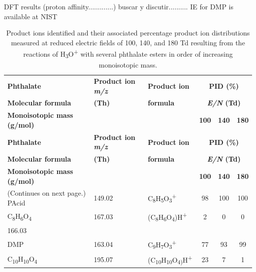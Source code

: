 DFT results (proton affinity.............) buscar y discutir..........
IE for DMP is available at NIST







{\small

\begin{longtable}[c]{lllccc}
\caption{Product ions identified and their associated percentage product ion distributions measured at reduced electric fields of 100, 140, and 180 Td resulting
from the reactions of H\textsubscript{3}O\textsuperscript{+} with several phthalate esters in order of increasing monoisotopic mass.} 
\label{table:PID}\\
\hline 
\textbf{Phthalate}& \textbf{Product ion \textit{m/z}} & \textbf{Product ion}  & \multicolumn{3}{c}{\textbf{PID (\%)}} \\ \cline{4-6} 
\textbf{Molecular formula} &\textbf{(Th)}&   \textbf{formula }& \multicolumn{3}{c}{\textbf{\textit{E/N} (Td)}} \\ \cline{4-6} 
\textbf{Monoisotopic mass (g/mol)  }      &                      &                     & \textbf{100 }     & \textbf{140}     & \textbf{180}  \\
\hline
\endfirsthead
\hline 
\textbf{Phthalate}& \textbf{Product ion \textit{m/z}} & \textbf{Product ion}  & \multicolumn{3}{c}{\textbf{PID (\%)}} \\ \cline{4-6} 
\textbf{Molecular formula} &\textbf{(Th)}&   \textbf{formula }& \multicolumn{3}{c}{\textbf{\textit{E/N} (Td)}} \\ \cline{4-6} 
\textbf{Monoisotopic mass (g/mol)  }      &                      &                     & \textbf{100 }     & \textbf{140}     & \textbf{180}  \\
\hline
\endhead
%
  (Continues on next page.)
\endfoot
%
\endlastfoot
PAcid   & 149.02  & C\textsubscript{8}H\textsubscript{5}O\textsubscript{3}\textsuperscript{+}  & 98  & 100  & 100   \\
C\textsubscript{8}H\textsubscript{6}O\textsubscript{4}  & 167.03  & (C\textsubscript{8}H\textsubscript{6}O\textsubscript{4})H\textsuperscript{+}  & 2  & 0  & 0  \\
166.03  & & & & &  \\
\hline
DMP       &    163.04    &  C\textsubscript{9}H\textsubscript{7}O\textsubscript{3}\textsuperscript{+}   & 77 & 93 & 99   \\
C\textsubscript{10}H\textsubscript{10}O\textsubscript{4}          &    195.07            & (C\textsubscript{10}H\textsubscript{10}O\textsubscript{4)}H\textsuperscript{+} & 23& 7& 1\\

\end{longtable}}
